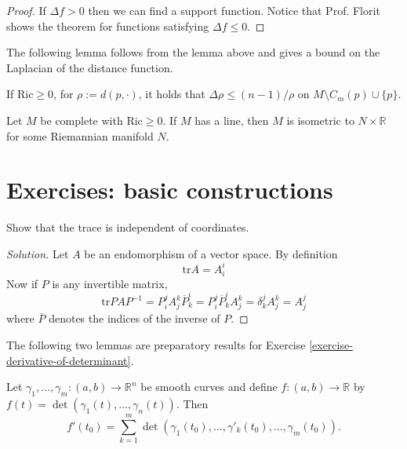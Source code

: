 \documentclass{book}
\begin{document}
\begin{proof}
If $\Delta f>0$ then we can find a support
function. Notice that Prof. Florit
shows the theorem for functions satisfying
$\Delta f \leq 0$.
\end{proof}

The following lemma follows from the lemma
above and gives a bound on the
Laplacian of the distance function.

\begin{lemma}[Calabi]
\label{lemma-Calabi}
If $\text{Ric} \geq 0$, for
$\rho:=d(p,\cdot)$, it holds that
$\Delta\rho \leq (n-1)/\rho$ on $M\setminus
C_m(p)\cup\{p\}$.
\end{lemma}


\begin{theorem}
\label{theorem-splitting}
Let $M$ be complete with  $\text{Ric}\geq0$.
If $M$ has a line, then $M$ is
isometric to $N\times\mathbb{R}$ for some
Riemannian manifold $N$.
\end{theorem}

\section{Exercises: basic constructions}
\label{section-exercises-constructions}

\begin{exercise}
\label{exercise-trace-indep-coord}
Show that the trace is independent of
coordinates.
\end{exercise}

\begin{proof}[Solution]
Let $A$ be an endomorphism of a vector space.
By definition
$$
\text{tr}A=A_i^i
$$
Now if $P$ is any invertible matrix,
$$
\text{tr}PAP^{-1}=P^j_iA_j^k\overline{P}_k^i=
P^j_i\overline{P}_k^iA_j^k
=\delta_k^jA_j^k=A_j^j
$$
where $\overline{P}$ denotes the indices of
the inverse of $P$.
\end{proof}

The following two lemmas are preparatory
results for Exercise
\ref{exercise-derivative-of-determinant}.

\begin{lemma}
\label{lemma-for-derivative-of-determinant1}
Let
$\gamma_1,...,\gamma_m:(a,b)\to\mathbb{R}^n$
be smooth curves and define
$f:(a,b)\to\mathbb{R}$ by
$f(t)=\det(\gamma_1(t),\ldots,\gamma_n(t))$.
Then
$$
f'(t_0)
=\sum_{k=1}^{m}\det(\gamma_1(t_0),\ldots,
\gamma'_k(t_0),\ldots,\gamma_m(t_0)).
$$
\end{lemma}
\end{document}
